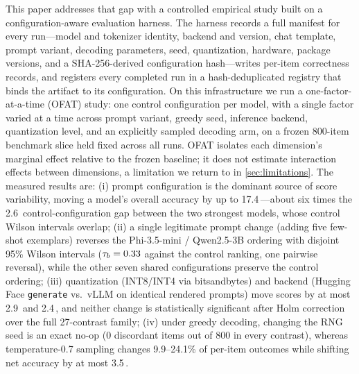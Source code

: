 This paper addresses that gap with a controlled empirical study built on a
configuration-aware evaluation harness. The harness records a full manifest
for every run---model and tokenizer identity, backend and version, chat
template, prompt variant, decoding parameters, seed, quantization, hardware,
package versions, and a SHA-256-derived configuration hash---writes per-item
correctness records, and registers every completed run in a hash-deduplicated
registry that binds the artifact to its configuration. On this infrastructure
we run a one-factor-at-a-time (OFAT) study: one control configuration per
model, with a single factor varied at a time across prompt variant, greedy
seed, inference backend, quantization level, and an explicitly sampled
decoding arm, on a frozen 800-item benchmark slice held fixed across all
runs. OFAT isolates each dimension's marginal effect relative to the frozen
baseline; it does not estimate interaction effects between dimensions, a
limitation we return to in \cref{sec:limitations}.
The measured results are: (i) prompt configuration is the dominant source
of score variability, moving a model's overall accuracy by up to
17.4\,\pp{}---about six times the 2.6\,\pp{} control-configuration gap between
the two strongest models, whose control Wilson intervals overlap; (ii) a
single legitimate prompt change (adding five few-shot exemplars) reverses
the Phi-3.5-mini / Qwen2.5-3B ordering with disjoint 95\% Wilson intervals
($\tau_b=0.33$ against the control ranking, one pairwise reversal), while
the other seven shared configurations preserve the control ordering; (iii)
quantization (INT8/INT4 via bitsandbytes) and backend (Hugging Face
\texttt{generate} vs.\ vLLM on identical rendered prompts) move scores by
at most 2.9\,\pp{} and 2.4\,\pp{}, and neither change is statistically
significant after Holm correction over the full 27-contrast family; (iv)
under greedy decoding, changing the RNG seed is an exact no-op (0 discordant
items out of 800 in every contrast), whereas temperature-0.7 sampling
changes 9.9--24.1\% of per-item outcomes while shifting net accuracy by at
most 3.5\,\pp{}.

